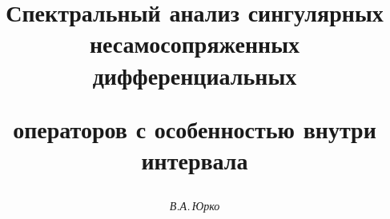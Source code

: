 




%





\newcommand{\A}{\cal A}


\newcommand{\re}{\operatorname{Re}}


\newcommand{\im}{\operatorname{Im}}


\newcommand{\vraisup}{\operatornamewithlimits{vrai~sup}}


\newcommand{\al}{\alpha}


\newcommand{\be}{\beta}


\newcommand{\ga}{\gamma}


\newcommand{\de}{\delta}


\newcommand{\la}{\lambda}


\newcommand{\om}{\omega}


\newcommand{\ee}{\varepsilon}


\newcommand{\vv}{\varphi}


\newcommand{\iy}{\infty}


\newcommand{\tts}[1]{}










\setcounter{page}{58}















\author{\it В.А.\,Юрко}




\title{Спектральный анализ сингулярных несамосопряженных дифференциальных


операторов с особенностью внутри интервала}


